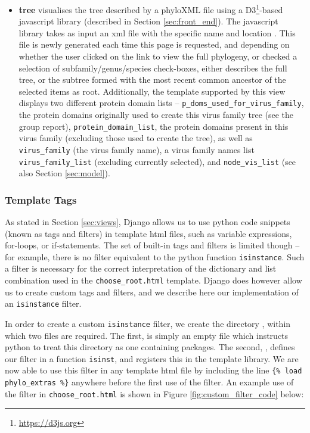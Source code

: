 \documentclass[12pt,a4paper]{article}
\begin{document}
\begin{itemize}
\item {\bf tree} visualises the tree described by a phyloXML file using a D3\footnote{\url{https://d3js.org}}-based javascript library (described in Section \ref{sec:front_end}). The javascript library takes as input an xml file with the specific name and location . This file is newly generated each time this page is requested, and depending on whether the user clicked on the link to view the full phylogeny, or checked a selection of subfamily/genus/species check-boxes, either describes the full tree, or the subtree formed with the most recent common ancestor of the selected items as root. Additionally, the template supported by this view displays two different protein domain lists -- \texttt{p\_doms\_used\_for\_virus\_family}, the protein domains originally used to create this virus family tree (see the group report), \texttt{protein\_domain\_list}, the protein domains present in this virus family (excluding those used to create the tree), as well as \texttt{virus\_family} (the virus family name), a virus family names list \texttt{virus\_family\_list} (excluding currently selected), and \texttt{node\_vis\_list} (see also Section \ref{sec:model}).
\end{itemize}

\subsubsection{Template Tags}
\label{sec:template_tags}
As stated in Section \ref{sec:views}, Django allows us to use python code snippets (known as tags and filters) in template html files, such as variable expressions, for-loops, or if-statements. The set of built-in tags and filters is limited though -- for example, there is no filter equivalent to the python function \texttt{isinstance}. Such a filter is necessary for the correct interpretation of the dictionary and list combination used in the \texttt{choose\_root.html} template. Django does however allow us to create custom tags and filters, and we describe here our implementation of an \texttt{isinstance} filter.

In order to create a custom \texttt{isinstance} filter, we create the directory , within which two files are required. The first,  is simply an empty file which instructs python to treat this directory as one containing packages. The second, , defines our filter in a function \texttt{isinst}, and registers this in the template library. We are now able to use this filter in any template html file by including the line \texttt{\{\% load phylo\_extras \%\}} anywhere before the first use of the filter. An example use of the filter in \texttt{choose\_root.html} is shown in Figure \ref{fig:custom_filter_code} below:
\end{document}
